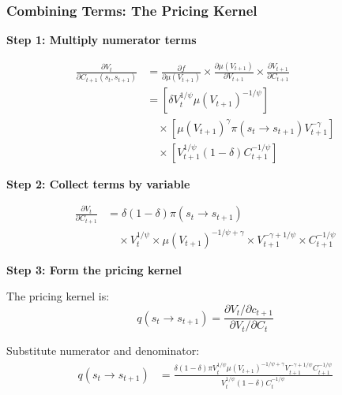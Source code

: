 \documentclass{beamer}
\begin{document}
\begin{frame}[allowframebreaks]
    \frametitle{Combining Terms: The Pricing Kernel}
    
    \textbf{Step 1: Multiply numerator terms}
    
    \begin{equation*}
        \begin{aligned}
            \frac{\partial V_t}{\partial C_{t+1}(s_t, s_{t+1})} &= \frac{\partial f}{\partial \mu(V_{t+1})} \times \frac{\partial \mu(V_{t+1})}{\partial V_{t+1}} \times \frac{\partial V_{t+1}}{\partial C_{t+1}} \\[0.3cm]
            &= \left[ \delta V_t^{1/\psi} \mu(V_{t+1})^{-1/\psi} \right] \\
            &\quad \times \left[ \mu(V_{t+1})^{\gamma} \pi(s_t \to s_{t+1}) V_{t+1}^{-\gamma} \right] \\
            &\quad \times \left[ V_{t+1}^{1/\psi} (1-\delta) C_{t+1}^{-1/\psi} \right]
        \end{aligned}
    \end{equation*}
    
    \framebreak
    
    \textbf{Step 2: Collect terms by variable}
    
    \begin{equation*}
        \begin{aligned}
            \frac{\partial V_t}{\partial C_{t+1}} &= \delta (1-\delta) \pi(s_t \to s_{t+1}) \\
            &\quad \times V_t^{1/\psi} \times \mu(V_{t+1})^{-1/\psi + \gamma} \times V_{t+1}^{-\gamma + 1/\psi} \times C_{t+1}^{-1/\psi}
        \end{aligned}
    \end{equation*}
    
    \framebreak
    
    \textbf{Step 3: Form the pricing kernel}
    
    The pricing kernel is:
    \begin{equation*}
        q(s_t \to s_{t+1}) = \frac{\partial V_t/\partial c_{t+1}}{\partial V_t/\partial C_t}
    \end{equation*}
    
    Substitute numerator and denominator:
    \begin{equation*}
        \begin{aligned}
            q(s_t \to s_{t+1}) &= \frac{\delta (1-\delta) \pi V_t^{1/\psi} \mu(V_{t+1})^{-1/\psi + \gamma} V_{t+1}^{-\gamma + 1/\psi} C_{t+1}^{-1/\psi}}{V_t^{1/\psi} (1-\delta) C_t^{-1/\psi}}
        \end{aligned}
    \end{equation*}
    

\end{frame}
\end{document}
